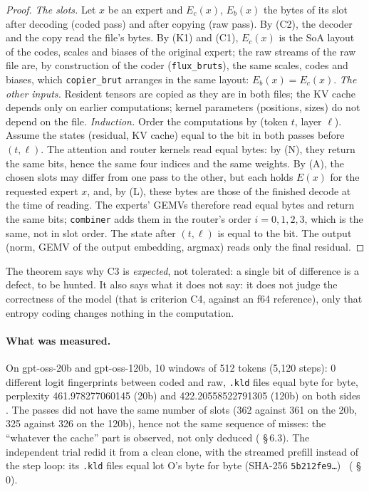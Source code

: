 \begin{proof}
\emph{The slots.} Let $x$ be an expert and $E_c(x)$, $E_b(x)$ the bytes of its slot after decoding (coded pass) and after copying (raw pass). By (C2), the decoder and the copy read the file's bytes. By (K1) and (C1), $E_c(x)$ is the SoA layout of the codes, scales and biases of the original expert; the raw streams of the raw file are, by construction of the coder (\texttt{flux\_bruts}), the same scales, codes and biases, which \texttt{copier\_brut} arranges in the same layout: $E_b(x) = E_c(x)$.
\emph{The other inputs.} Resident tensors are copied as they are in both files; the KV cache depends only on earlier computations; kernel parameters (positions, sizes) do not depend on the file.
\emph{Induction.} Order the computations by (token $t$, layer $\ell$). Assume the states (residual, KV cache) equal to the bit in both passes before $(t, \ell)$. The attention and router kernels read equal bytes: by (N), they return the same bits, hence the same four indices and the same weights. By (A), the chosen slots may differ from one pass to the other, but each holds $E(x)$ for the requested expert $x$, and, by (L), these bytes are those of the finished decode at the time of reading. The experts' GEMVs therefore read equal bytes and return the same bits; \texttt{combiner} adds them in the router's order $i = 0, 1, 2, 3$, which is the same, not in slot order. The state after $(t, \ell)$ is equal to the bit. The output (norm, GEMV of the output embedding, argmax) reads only the final residual.
\end{proof}

The theorem says why C3 is \emph{expected}, not tolerated: a single bit of difference is a defect, to be hunted. It also says what it does not say: it does not judge the correctness of the model (that is criterion C4, against an f64 reference), only that entropy coding changes nothing in the computation.

\paragraph{What was measured.} On gpt-oss-20b and gpt-oss-120b, 10 windows of 512 tokens (5{,}120 steps): 0 different logit fingerprints between coded and raw, \texttt{.kld} files equal byte for byte, perplexity 461.978277060145 (20b) and 422.20558522791305 (120b) on both sides \mes. The passes did not have the same number of slots (362 against 361 on the 20b, 325 against 326 on the 120b), hence not the same sequence of misses: the ``whatever the cache'' part is observed, not only deduced ( §\,6.3). The independent trial redid it from a clean clone, with the streamed prefill instead of the step loop: its \texttt{.kld} files equal lot O's byte for byte (SHA-256 \texttt{5b212fe9…}) \mes~( §\,0).

